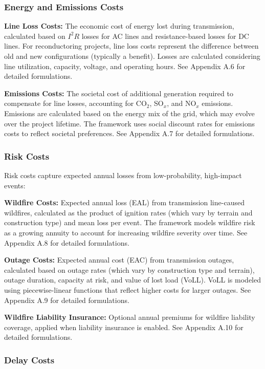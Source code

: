 \documentclass[11pt,twocolumn,a4paper]{article}
\begin{document}
\subsubsection{Energy and Emissions Costs}

\textbf{Line Loss Costs:} The economic cost of energy lost during transmission, calculated based on $I^2R$ losses for AC lines and resistance-based losses for DC lines. For reconductoring projects, line loss costs represent the difference between old and new configurations (typically a benefit). Losses are calculated considering line utilization, capacity, voltage, and operating hours. See Appendix A.6 for detailed formulations.

\textbf{Emissions Costs:} The societal cost of additional generation required to compensate for line losses, accounting for CO$_2$, SO$_x$, and NO$_x$ emissions. Emissions are calculated based on the energy mix of the grid, which may evolve over the project lifetime. The framework uses social discount rates for emissions costs to reflect societal preferences. See Appendix A.7 for detailed formulations.

\subsubsection{Risk Costs}

Risk costs capture expected annual losses from low-probability, high-impact events:

\textbf{Wildfire Costs:} Expected annual loss (EAL) from transmission line-caused wildfires, calculated as the product of ignition rates (which vary by terrain and construction type) and mean loss per event. The framework models wildfire risk as a growing annuity to account for increasing wildfire severity over time. See Appendix A.8 for detailed formulations.

\textbf{Outage Costs:} Expected annual cost (EAC) from transmission outages, calculated based on outage rates (which vary by construction type and terrain), outage duration, capacity at risk, and value of lost load (VoLL). VoLL is modeled using piecewise-linear functions that reflect higher costs for larger outages. See Appendix A.9 for detailed formulations.

\textbf{Wildfire Liability Insurance:} Optional annual premiums for wildfire liability coverage, applied when liability insurance is enabled. See Appendix A.10 for detailed formulations.

\subsubsection{Delay Costs}
\end{document}
